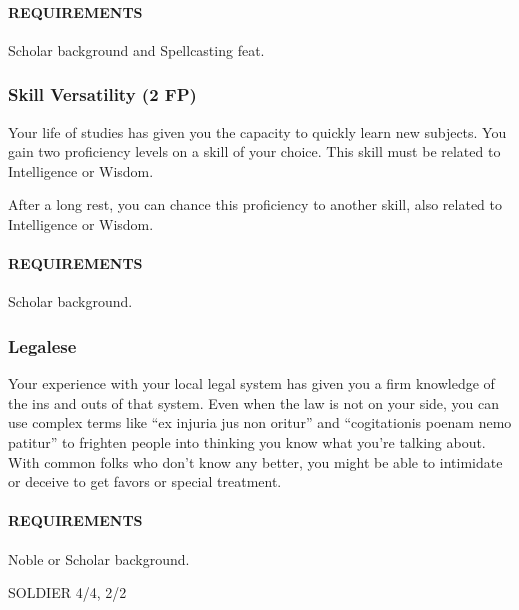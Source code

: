         \paragraph{REQUIREMENTS} Scholar background and Spellcasting feat.

    \subsubsection{Skill Versatility (2 FP)} \label{feat::skillversatility}
        Your life of studies has given you the capacity to quickly learn new subjects.
        You gain two proficiency levels on a skill of your choice.
        This skill must be related to Intelligence or Wisdom.

        After a long rest, you can chance this proficiency to another skill, also related to Intelligence or Wisdom.
        \paragraph{REQUIREMENTS} Scholar background.

    \subsubsection{Legalese} \label{feat::legalese}
        Your experience with your local legal system has given you a firm knowledge of the ins and outs of that system.
        Even when the law is not on your side, you can use complex terms like ``ex injuria jus non oritur'' and ``cogitationis poenam nemo patitur'' to frighten people into thinking you know what you're talking about.
        With common folks who don't know any better, you might be able to intimidate or deceive to get favors or special treatment.
        \paragraph{REQUIREMENTS} Noble or Scholar background.

SOLDIER 4/4, 2/2

